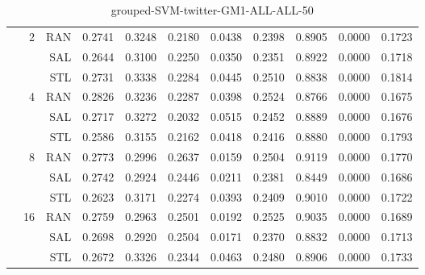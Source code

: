 \begin{center}
\begin{table}[htbp]
\begin{center}
\begin{tabular}{ | r | r | r | r | r | r | r | r | r | r | r |}
 & \multirow{3}{*}{2} & RAN & 0.2741 & 0.3248 & 0.2180 & 0.0438 & 0.2398 & 0.8905 & 0.0000 & 0.1723\\ \cline{3-11}
 &   & SAL & 0.2644 & 0.3100 & 0.2250 & 0.0350 & 0.2351 & 0.8922 & 0.0000 & 0.1718\\ \cline{3-11}
 &   & STL & 0.2731 & 0.3338 & 0.2284 & 0.0445 & 0.2510 & 0.8838 & 0.0000 & 0.1814\\ \cline{2-11}
 & \multirow{3}{*}{4} & RAN & 0.2826 & 0.3236 & 0.2287 & 0.0398 & 0.2524 & 0.8766 & 0.0000 & 0.1675\\ \cline{3-11}
 &   & SAL & 0.2717 & 0.3272 & 0.2032 & 0.0515 & 0.2452 & 0.8889 & 0.0000 & 0.1676\\ \cline{3-11}
 &   & STL & 0.2586 & 0.3155 & 0.2162 & 0.0418 & 0.2416 & 0.8880 & 0.0000 & 0.1793\\ \cline{2-11}
 & \multirow{3}{*}{8} & RAN & 0.2773 & 0.2996 & 0.2637 & 0.0159 & 0.2504 & 0.9119 & 0.0000 & 0.1770\\ \cline{3-11}
 &   & SAL & 0.2742 & 0.2924 & 0.2446 & 0.0211 & 0.2381 & 0.8449 & 0.0000 & 0.1686\\ \cline{3-11}
 &   & STL & 0.2623 & 0.3171 & 0.2274 & 0.0393 & 0.2409 & 0.9010 & 0.0000 & 0.1722\\ \cline{2-11}
 & \multirow{3}{*}{16} & RAN & 0.2759 & 0.2963 & 0.2501 & 0.0192 & 0.2525 & 0.9035 & 0.0000 & 0.1689\\ \cline{3-11}
 &   & SAL & 0.2698 & 0.2920 & 0.2504 & 0.0171 & 0.2370 & 0.8832 & 0.0000 & 0.1713\\ \cline{3-11}
 &   & STL & 0.2672 & 0.3326 & 0.2344 & 0.0463 & 0.2480 & 0.8906 & 0.0000 & 0.1733\\ \cline{2-11}
\hline
\end{tabular}
\caption{grouped-SVM-twitter-GM1-ALL-ALL-50}
\end{center}
 \end{table}
\end{center}

